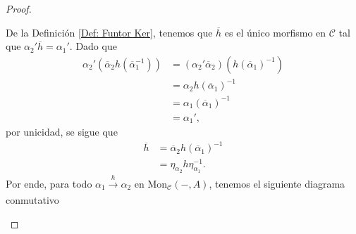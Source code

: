 \documentclass[tesis]{subfiles}
\begin{document}
\begin{proof}
\begin{enumerate}[label=(\alph*)]
\begin{center}
        \end{center}
        De la Definición \ref{Def: Funtor Ker}, tenemos que $\overline{h}$ es el único morfismo en $\mathscr{C}$ tal que $\alpha_2'\overline{h}=\alpha_1'$. Dado que
        \begin{align*}
            \alpha_2'(\overline{\alpha}_2h(\overline{\alpha}_1^{-1})) &= (\alpha_2'\overline{\alpha}_2)(h(\overline{\alpha}_1)^{-1}) \\
                                                                      &= \alpha_2 h(\overline{\alpha}_1)^{-1} \\
                                                                      &= \alpha_1(\overline{\alpha}_1)^{-1} \\
                                                                      &= \alpha_1',
        \end{align*}
        por unicidad, se sigue que
        \begin{align*}
            \overline{h} &= \overline{\alpha}_2 h (\overline{\alpha}_1)^{-1} \\
                         &= \eta_{\alpha_2} h \eta_{\alpha_1}^{-1}.
        \end{align*}
        Por ende, para todo $\alpha_1\xrightarrow[]{h} \alpha_2$ en $\text{Mon}_\mathscr{C}(-,A)$, tenemos el siguiente diagrama conmutativo
        \begin{center}
        \end{center}


\end{enumerate}
\end{proof}
\end{document}
